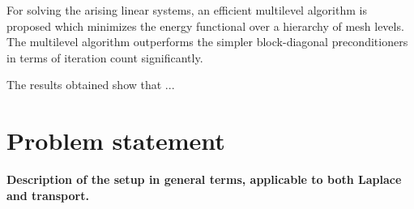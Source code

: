 \documentclass[a4paper,12pt]{amsart}
\numberwithin{equation}{section}
\renewcommand{\div}{\operatorname{div}}
\renewcommand{\L}{{\mathcal L}}
\def\XVec#1{{\mathbf #1}}
\def\Xx{\XVec{x}}
\def\bsigma{{\boldsymbol \sigma}}
\begin{document}
For solving the arising linear systems, an efficient multilevel algorithm is proposed which minimizes the energy functional over a hierarchy of mesh levels. The multilevel algorithm outperforms the simpler block-diagonal preconditioners in terms of iteration count significantly.

The results obtained show that ...

\section{Problem statement}

\textbf{Description of the setup in general terms, applicable to both Laplace and transport.}

%
%
%
%
\end{document}
